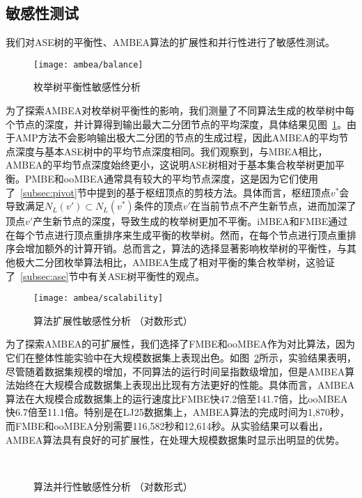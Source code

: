 \subsection{敏感性测试}

我们对ASE树的平衡性、AMBEA算法的扩展性和并行性进行了敏感性测试。

\begin{figure} [H]
	\centering
	\texttt{[image: ambea/balance]}
	\caption{枚举树平衡性敏感性分析}
	\label{fig:ambea_exp_balance}
\end{figure}

为了探索AMBEA对枚举树平衡性的影响，我们测量了不同算法生成的枚举树中每个节点的深度，并计算得到输出最大二分团节点的平均深度，具体结果见图~\ref{fig:ambea_exp_balance}。由于AMP方法不会影响输出极大二分团的节点的生成过程，因此AMBEA的平均节点深度与基本ASE树中的平均节点深度相同。我们观察到，与MBEA相比，AMBEA的平均节点深度始终更小，这说明ASE树相对于基本集合枚举树更加平衡。PMBE和ooMBEA通常具有较大的平均节点深度，这是因为它们使用了~\ref{subsec:pivot}节中提到的基于枢纽顶点的剪枝方法。具体而言，枢纽顶点$v^*$会导致满足$N_L(v')\subset N_L(v^*)$条件的顶点$v'$在当前节点不产生新节点，进而加深了顶点$v'$产生新节点的深度，导致生成的枚举树更加不平衡。iMBEA和FMBE通过在每个节点进行顶点重排序来生成平衡的枚举树。然而，在每个节点进行顶点重排序会增加额外的计算开销。总而言之，算法的选择显著影响枚举树的平衡性，与其他极大二分团枚举算法相比，AMBEA生成了相对平衡的集合枚举树，这验证了~\ref{subsec:ase}节中有关ASE树平衡性的观点。

\begin{figure} [H]
	\centering
	\texttt{[image: ambea/scalability]}
	\caption{算法扩展性敏感性分析 （对数形式）}
	\label{fig:ambea_exp_scalability}
\end{figure}

为了探索AMBEA的可扩展性，我们选择了FMBE和ooMBEA作为对比算法，因为它们在整体性能实验中在大规模数据集上表现出色。如图~\ref{fig:ambea_exp_scalability}所示，实验结果表明，尽管随着数据集规模的增加，不同算法的运行时间呈指数级增加，但是AMBEA算法始终在大规模合成数据集上表现出比现有方法更好的性能。具体而言，AMBEA算法在大规模合成数据集上的运行速度比FMBE快47.2倍至141.7倍，比ooMBEA快6.7倍至11.1倍。特别是在LJ25数据集上，AMBEA算法的完成时间为1,870秒，而FMBE和ooMBEA分别需要116,582秒和12,614秒。从实验结果可以看出，AMBEA算法具有良好的可扩展性，在处理大规模数据集时显示出明显的优势。


\begin{figure} [H]
	\centering
  \quad
  \\
  \quad
  

	\caption{算法并行性敏感性分析 （对数形式）}
	\label{fig:ambea_paral}
\end{figure}

